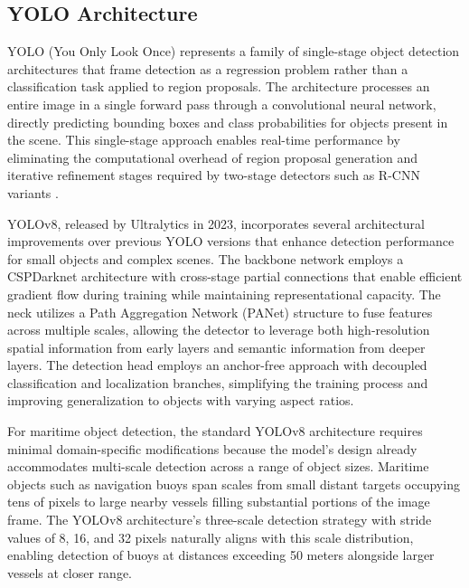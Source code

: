 \documentclass{erauthesis}
\begin{document}
\subsection{YOLO Architecture } \label{sec:yolo_architecture}

YOLO (You Only Look Once) represents a family of single-stage object detection architectures that frame detection as a regression problem rather than a classification task applied to region proposals.
The architecture processes an entire image in a single forward pass through a convolutional neural network, directly predicting bounding boxes and class probabilities for objects present in the scene.
This single-stage approach enables real-time performance by eliminating the computational overhead of region proposal generation and iterative refinement stages required by two-stage detectors such as R-CNN variants \cite{ultralytics}.

YOLOv8, released by Ultralytics in 2023, incorporates several architectural improvements over previous YOLO versions that enhance detection performance for small objects and complex scenes.
The backbone network employs a CSPDarknet architecture with cross-stage partial connections that enable efficient gradient flow during training while maintaining representational capacity.
The neck utilizes a Path Aggregation Network (PANet) structure to fuse features across multiple scales, allowing the detector to leverage both high-resolution spatial information from early layers and semantic information from deeper layers.
The detection head employs an anchor-free approach with decoupled classification and localization branches, simplifying the training process and improving generalization to objects with varying aspect ratios.

For maritime object detection, the standard YOLOv8 architecture requires minimal domain-specific modifications because the model's design already accommodates multi-scale detection across a range of object sizes.
Maritime objects such as navigation buoys span scales from small distant targets occupying tens of pixels to large nearby vessels filling substantial portions of the image frame.
The YOLOv8 architecture's three-scale detection strategy with stride values of 8, 16, and 32 pixels naturally aligns with this scale distribution, enabling detection of buoys at distances exceeding 50 meters alongside larger vessels at closer range.
\end{document}
